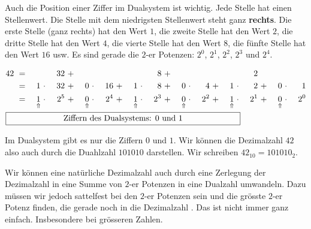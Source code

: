 Auch die Position einer Ziffer im Dualsystem ist wichtig. Jede Stelle hat einen Stellenwert. Die Stelle mit dem niedrigsten Stellenwert steht ganz \textbf{rechts}. Die erste Stelle (ganz rechts) hat den Wert $1$, die zweite Stelle hat den Wert $2$, die dritte Stelle hat den Wert $4$, die vierte Stelle hat den Wert $8$, die fünfte Stelle hat den Wert $16$ usw. Es sind gerade die $2$-er Potenzen: $2^0$, $2^1$, $2^2$, $2^3$ und $2^4$.

\begin{example}
\label{ex:analyse-42}
\begin{alignat*}{16}
42 & ~ = ~ & & & 32 & ~ + ~ & & & & & & & 8 & ~ + ~ & & & & & & & 2 &\\
& ~ = ~ & 1 & ~\cdot~ & 32 & ~ + ~ & 0 & ~\cdot~ & 16 & ~ + ~ & 1 & ~\cdot~ & 8 & ~ + ~ & 0 & ~\cdot~ & 4 & ~ + ~ & 1 & ~\cdot~ & 2 & ~ + ~ & 0 & ~\cdot~ & 1 \\
& ~ = ~ & \underset{\Uparrow}{1} & ~\cdot~ & 2^5  & ~ + ~ & \underset{\Uparrow}{0} & ~\cdot~ & 2^4  & ~ + ~ & \underset{\Uparrow}{1} & ~\cdot~ & 2^3 & ~ + ~ & \underset{\Uparrow}{0} & ~\cdot~ & 2^2 & ~ + ~ & \underset{\Uparrow}{1} & ~\cdot~ & 2^1 & ~ + ~ & \underset{\Uparrow}{0} & ~\cdot~ & 2^0 \\
\omit\rlap{\framebox[10cm]{Ziffern des Dualsystems: $0$ und $1$}}
\end{alignat*}

Im Dualsystem gibt es nur die Ziffern $0$ und $1$. Wir können die Dezimalzahl $42$ also auch durch die Duahlzahl $101010$ darstellen. Wir schreiben $42_{10} = 101010_2$.

\end{example}

Wir können eine natürliche Dezimalzahl auch durch eine Zerlegung der Dezimalzahl in eine Summe von $2$-er Potenzen in eine Dualzahl umwandeln. Dazu müssen wir jedoch sattelfest bei den $2$-er Potenzen sein und die grösste $2$-er Potenz finden, die gerade noch in die Dezimalzahl . Das ist nicht immer ganz einfach. Insbesondere bei grösseren Zahlen.

